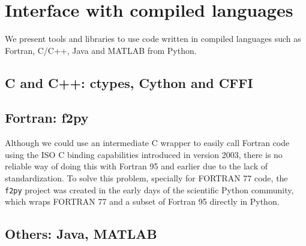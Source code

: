 \section{Interface with compiled languages}
\label{sec:interface}

We present tools and libraries to use code written in compiled languages such as Fortran, C/C++, Java and MATLAB from Python.

\subsection{C and C++: ctypes, Cython and CFFI}

\subsection{Fortran: f2py}

Although we could use an intermediate C wrapper to easily call Fortran code using the ISO C binding capabilities introduced in version 2003, there is no reliable way of doing this with Fortran 95 and earlier due to the lack of standardization. To solve this problem, specially for FORTRAN 77 code, the \verb|f2py| project was created in the early days of the scientific Python community, which wraps FORTRAN 77 and a subset of Fortran 95 directly in Python\cite{peterson2009f2py}.

\subsection{Others: Java, MATLAB}